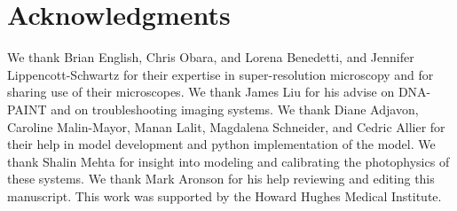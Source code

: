 \section{Acknowledgments}
We thank Brian English, Chris Obara, and Lorena Benedetti, and Jennifer Lippencott-Schwartz for their expertise in
    super-resolution microscopy and for sharing use of their microscopes. 
    We thank James Liu for his advise on DNA-PAINT and on troubleshooting imaging systems.
    We thank Diane Adjavon, Caroline Malin-Mayor, Manan Lalit, Magdalena Schneider, and Cedric Allier 
    for their help in model development and python implementation of the model. 
    We thank Shalin Mehta for insight into modeling and calibrating the photophysics of these systems.
    We thank Mark Aronson for his help reviewing and editing this manuscript. 
    This work was supported by the Howard Hughes Medical Institute. 